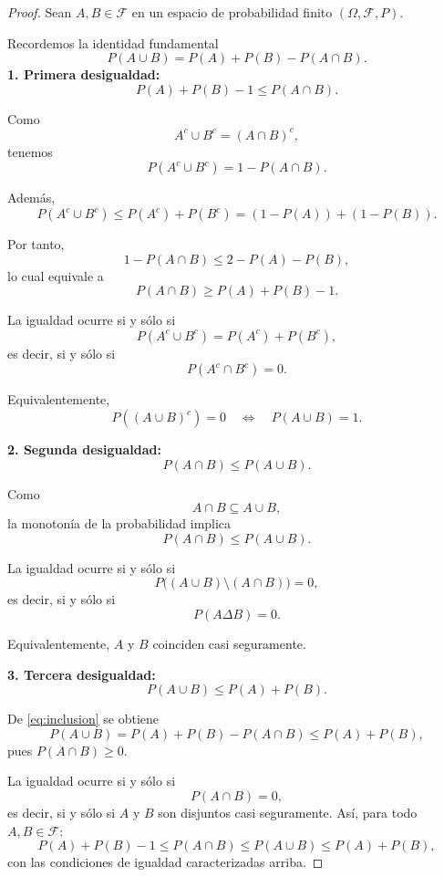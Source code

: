 \documentclass[12pt,a4paper]{article}
\begin{document}
    \begin{proof}
         Sean $A,B\in\mathcal F$ en un espacio de probabilidad finito
    $(\Omega,\mathcal F,P)$.

    Recordemos la identidad fundamental
    \begin{equation}\label{eq:inclusion}
        P(A\cup B)=P(A)+P(B)-P(A\cap B).
    \end{equation}
        \textbf{1. Primera desigualdad:}
        \[
            P(A)+P(B)-1 \le P(A\cap B).
        \]
    
        Como
        \[
            A^c\cup B^c=(A\cap B)^c,
        \]
        tenemos
        \[
            P(A^c\cup B^c)=1-P(A\cap B).
        \]
    
        Además,
        \[
            P(A^c\cup B^c)\le P(A^c)+P(B^c)
            =(1-P(A))+(1-P(B)).
        \]
    
        Por tanto,
        \[
            1-P(A\cap B)\le 2-P(A)-P(B),
        \]
        lo cual equivale a
        \[
            P(A\cap B)\ge P(A)+P(B)-1.
        \]
    
        \medskip
    
        La igualdad ocurre si y sólo si
        \[
            P(A^c\cup B^c)=P(A^c)+P(B^c),
        \]
        es decir, si y sólo si
        \[
            P(A^c\cap B^c)=0.
        \]
    
        Equivalentemente,
        \[
            P((A\cup B)^c)=0
            \quad\Longleftrightarrow\quad
            P(A\cup B)=1.
        \]
    
        \medskip
    
        \textbf{2. Segunda desigualdad:}
        \[
            P(A\cap B)\le P(A\cup B).
        \]
    
        Como
        \[
            A\cap B \subseteq A\cup B,
        \]
        la monotonía de la probabilidad implica
        \[
            P(A\cap B)\le P(A\cup B).
        \]
    
        \medskip
    
        La igualdad ocurre si y sólo si
        \[
            P\big((A\cup B)\setminus(A\cap B)\big)=0,
        \]
        es decir, si y sólo si
        \[
            P(A\Delta B)=0.
        \]
    
        Equivalentemente, $A$ y $B$ coinciden casi seguramente.
    
        \medskip
    
        \textbf{3. Tercera desigualdad:}
        \[
            P(A\cup B)\le P(A)+P(B).
        \]
    
        De \eqref{eq:inclusion} se obtiene
        \[
            P(A\cup B)=P(A)+P(B)-P(A\cap B)
            \le P(A)+P(B),
        \]
        pues $P(A\cap B)\ge 0$.
    
        La igualdad ocurre si y sólo si
        \[
            P(A\cap B)=0,
        \]
        es decir, si y sólo si $A$ y $B$ son disjuntos casi seguramente.
        Así, para todo $A,B\in\mathcal F$:
        \[
            P(A)+P(B)-1
            \le P(A\cap B)
            \le P(A\cup B)
            \le P(A)+P(B),
        \]
        con las condiciones de igualdad caracterizadas arriba.
    \end{proof}
\end{document}

